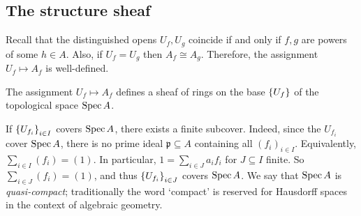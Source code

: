 \subsection{The structure sheaf}
Recall that the distinguished opens \( U_f, U_g \) coincide if and only if \( f, g \) are powers of some \( h \in A \).
Also, if \( U_f = U_g \) then \( A_f \cong A_g \).
Therefore, the assignment \( U_f \mapsto A_f \) is well-defined.
\begin{proposition}
    The assignment \( U_f \mapsto A_f \) defines a sheaf of rings on the base \( \qty{U_f} \) of the topological space \( \operatorname{Spec} A \).
\end{proposition}
\begin{remark}
    If \( \qty{U_{f_i}}_{i \in I} \) covers \( \operatorname{Spec} A \), there exists a finite subcover.
    Indeed, since the \( U_{f_i} \) cover \( \operatorname{Spec} A \), there is no prime ideal \( \mathfrak p \subseteq A \) containing all \( (f_i)_{i \in I} \).
    Equivalently, \( \sum_{i \in I} (f_i) = (1) \).
    In particular, \( 1 = \sum_{i \in J} a_i f_i \) for \( J \subseteq I \) finite.
    So \( \sum_{i \in J} (f_i) = (1) \), and thus \( \qty{U_{f_i}}_{i \in J} \) covers \( \operatorname{Spec} A \).
    We say that \( \operatorname{Spec} A \) is \emph{quasi-compact}; traditionally the word `compact' is reserved for Hausdorff spaces in the context of algebraic geometry.
\end{remark}
